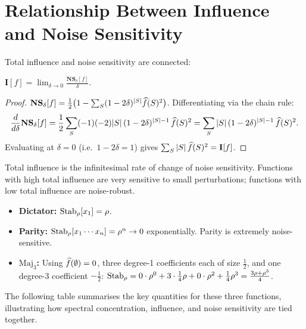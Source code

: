 \section{Relationship Between Influence and Noise Sensitivity}\label{sec:inf-ns}

Total influence and noise sensitivity are connected:

\begin{proposition}\label{prop:inf-ns}
$\mathbf{I}[f] = \lim_{\delta \to 0} \frac{\mathbf{NS}_\delta[f]}{\delta}$.
\end{proposition}

\begin{proof}
$\mathbf{NS}_\delta[f] = \frac{1}{2}\bigl(1 - \sum_S (1-2\delta)^{|S|} \widehat{f}(S)^2\bigr)$.
Differentiating via the chain rule:
\[
  \frac{d}{d\delta}\mathbf{NS}_\delta[f]
  = \frac{1}{2}\sum_S (-1)(-2)|S|\,(1-2\delta)^{|S|-1}\,\widehat{f}(S)^2
  = \sum_S |S|\,(1-2\delta)^{|S|-1}\,\widehat{f}(S)^2.
\]
Evaluating at $\delta = 0$ (i.e.\ $1-2\delta = 1$) gives
$\sum_S |S|\,\widehat{f}(S)^2 = \mathbf{I}[f]$.
\end{proof}

Total influence is the infinitesimal rate of change of noise sensitivity.
Functions with high total influence are very sensitive to small
perturbations; functions with low total influence are noise-robust.

\begin{example}\label{ex:noise-stab}
\begin{itemize}
  \item \textbf{Dictator:} $\operatorname{Stab}_\rho[x_1] = \rho$.
  \item \textbf{Parity:} $\operatorname{Stab}_\rho[x_1 \cdots x_n] = \rho^n \to 0$
    exponentially. Parity is extremely noise-sensitive.
  \item \textbf{$\text{Maj}_3$:} Using $\widehat{f}(\emptyset) = 0$,
    three degree-1 coefficients each of size $\frac{1}{2}$, and one
    degree-3 coefficient $-\frac{1}{2}$:
    $\operatorname{Stab}_\rho = 0 \cdot \rho^0 + 3 \cdot \tfrac{1}{4}\rho + 0 \cdot \rho^2 + \tfrac{1}{4}\rho^3 = \tfrac{3\rho + \rho^3}{4}$.
\end{itemize}
\end{example}

\medskip
The following table summarises the key quantities for these three
functions, illustrating how spectral concentration, influence, and noise
sensitivity are tied together.

